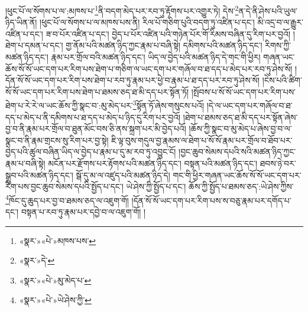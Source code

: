 །ཕུང་པོ་ལ་སོགས་པ་ལ་:མཁས་པ་\footnote{«སྣར་»«པེ་»མཁས་པས་}ནི་བདག་མེད་པར་རབ་ཏུ་རྟོགས་པར་འགྱུར་ཏེ། དེས་\footnote{«སྣར་»དེ་}ན་དེ་ནི་ཤེས་པའི་ཡུལ་ཉིད་ཡིན་ནོ། །ཕུང་པོ་ལ་སོགས་པ་ལ་མཁས་པས་ནི། རིལ་པོ་གཅིག་པུའི་བདག་ཏུ་འཛིན་པ་དང་། མི་འདྲ་བ་ལ་རྒྱུར་འཛིན་པ་དང་། ཟ་བ་པོར་འཛིན་པ་དང་། བྱེད་པ་པོར་འཛིན་པའི་གཉེན་པོར་གོ་རིམས་བཞིན་དུ་རིག་པར་བྱའོ། །ཐེག་པ་དམན་པ་དང་། གྱ་ནོམ་པའི་མཚན་ཉིད་ཀྱང་རྣམ་པ་བཞི་སྟེ། དམིགས་པའི་མཚན་ཉིད་དང་། རིགས་ཀྱི་མཚན་ཉིད་དང་། རྣམ་པར་གྲོལ་བའི་མཚན་ཉིད་དང་། ཡིད་ལ་བྱེད་པའི་མཚན་ཉིད་དེ་གང་གི་ཕྱིར། གཞན་ཡང་ཆོས་སོ་སོ་ཡང་དག་པར་རིག་པས་ཐེག་པ་གཅིག་ལ་ཡང་དག་པར་གཞོལ་བ་ཐ་དད་པ་མེད་པར་རབ་ཏུ་ཤེས་སོ། །དོན་སོ་སོ་ཡང་དག་པར་རིག་པས་ཐེག་པ་རབ་ཏུ་རྣམ་པར་ཕྱེ་བ་རྣམ་པ་ཐ་དད་པར་རབ་ཏུ་ཤེས་སོ། །ངེས་པའི་ཚིག་སོ་སོ་ཡང་དག་པར་རིག་པས་ཐེག་པ་ཐམས་ཅད་ཐ་མི་དད་པར་སྟོན་ཏོ། །སྤོབས་པ་སོ་སོ་ཡང་དག་པར་རིག་པས་ཐེག་པ་རེ་རེ་ལ་ཡང་ཆོས་ཀྱི་སྣང་བ་:མུ་མེད་པར་\footnote{«སྣར་»«པེ་»མུ་མེད་པ་}སྟོན་ཏོ་ཞེས་གསུངས་པའོ། །དེ་ལ་ཡང་དག་པར་གཞོལ་བ་ཐ་དད་པ་མེད་པ་ནི་དམིགས་པ་ཐ་དད་པ་མེད་པ་ཉིད་དུ་རིག་པར་བྱའོ། །ཐེག་པ་ཐམས་ཅད་ཐ་མི་དད་པར་སྟོན་ཞེས་བྱ་བ་ནི་རྣམ་པར་གྲོལ་བ་ཐུན་མོང་བས་ཅི་ནས་སྐྲག་པར་མི་བྱེད་པའོ། །ཆོས་ཀྱི་སྣང་བ་མུ་མེད་པ་ཞེས་བྱ་བ་ལ་སྣང་བ་ནི་རྣམ་གྲངས་སུ་རིག་པར་བྱ་སྟེ། ཇི་ལྟ་བུས་གདུལ་བྱ་རྣམས་ལ་ཐེག་པ་སོ་སོ་རྣམ་པར་གྲོལ་བ་ཐོབ་པར་བྱེད་པའི་ཚུལ་བཞིན་ཡིད་ལ་བྱེད་པ་རྣམ་པ་དུ་མ་རབ་ཏུ་འབྱུང་ངོ། །བྱང་ཆུབ་སེམས་དཔའི་སའི་མཚན་ཉིད་ཀྱང་རྣམ་པ་བཞི་སྟེ། མངོན་པར་རྫོགས་པར་རྟོགས་པའི་མཚན་ཉིད་དང་། བསྟན་པའི་མཚན་ཉིད་དང་། ཐབས་ཉེ་བར་སྒྲུབ་པའི་མཚན་ཉིད་དང་། སྒོ་དུ་མ་ལ་འཛུད་པའི་མཚན་ཉིད་དེ། གང་གི་ཕྱིར་གཞན་ཡང་ཆོས་སོ་སོ་ཡང་དག་པར་རིག་པས་བྱང་ཆུབ་སེམས་དཔའི་སྤྱོད་པ་དང་། ཡེ་ཤེས་ཀྱི་སྤྱོད་པ་དང་། ཆོས་ཀྱི་སྤྱོད་པ་ཐམས་ཅད་:ཡེ་ཤེས་ཀྱིས་\footnote{«སྣར་»«པེ་»ཡེ་ཤེས་ཀྱི་}ཁོང་དུ་ཆུད་པར་བྱ་བ་ཐམས་ཅད་ལ་འཇུག་གོ། །དོན་སོ་སོ་ཡང་དག་པར་རིག་པས་ས་བཅུ་རྣམ་པར་དགོད་པ་དང་། བསྟན་པ་རབ་ཏུ་རྣམ་པར་དབྱེ་བ་ལ་འཇུག་གོ། །
